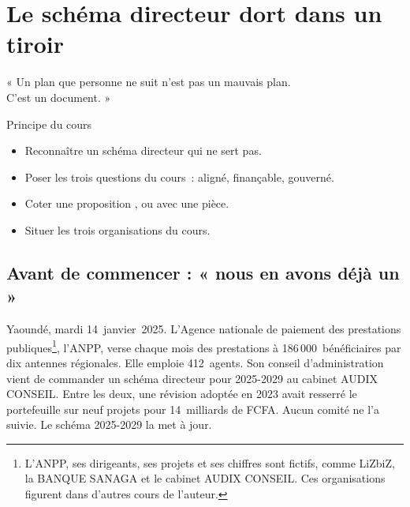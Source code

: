 
\chapter{Le schéma directeur dort dans un tiroir}
\label{chap:prologue}

\epigraph{%
    « Un plan que personne ne suit n'est pas un mauvais plan.\\
    C'est un document. »%
}{Principe du cours}


\begin{boxobjectifs}
\begin{itemize}
    \item Reconnaître un schéma directeur qui ne sert pas.
    \item Poser les trois questions du cours~: aligné, finançable, gouverné.
    \item Coter une proposition \OUI{}, \NON{} ou \NEK{} avec une pièce.
    \item Situer les trois organisations du cours.
\end{itemize}
\end{boxobjectifs}

\bigskip

\section*{Avant de commencer : « nous en avons déjà un »}

Yaoundé, mardi 14~janvier~2025. L'Agence nationale de paiement des prestations publiques\footnote{L'ANPP, ses dirigeants,
ses projets et ses chiffres sont fictifs, comme LiZbiZ, la BANQUE SANAGA et le cabinet AUDIX CONSEIL. Ces
organisations figurent dans d'autres cours de l'auteur.}, l'ANPP, verse chaque mois des prestations à
186\,000~bénéficiaires par dix antennes régionales. Elle emploie 412~agents. Son conseil d'administration vient de
commander un schéma directeur pour 2025-2029 au cabinet AUDIX CONSEIL. Entre les deux, une révision adoptée en 2023 avait resserré le portefeuille sur neuf projets pour 14~milliards de FCFA. Aucun comité ne l'a suivie. Le schéma 2025-2029 la met à jour.


